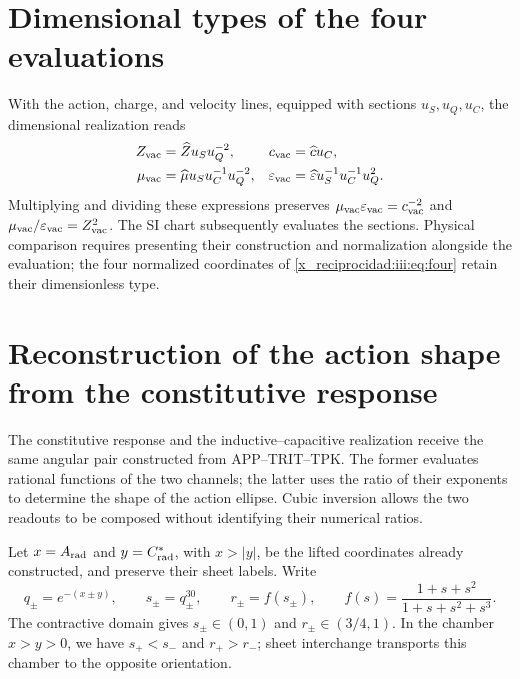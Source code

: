 \section{Dimensional types of the four evaluations}

With the action, charge, and velocity lines, equipped with sections
$u_S,u_Q,u_C$, the dimensional realization reads
\begin{align}
 Z_{\rm vac}&=\widehat Z u_Su_Q^{-2},&
 c_{\rm vac}&=\widehat c u_C,\\
 \mu_{\rm vac}&=\widehat\mu u_Su_C^{-1}u_Q^{-2},&
 \varepsilon_{\rm vac}&=\widehat\varepsilon u_S^{-1}u_C^{-1}u_Q^2.
 \label{x_reciprocidad:iii:eq:dimensions}
\end{align}
Multiplying and dividing these expressions preserves
$\mu_{\rm vac}\varepsilon_{\rm vac}=c_{\rm vac}^{-2}$ and
$\mu_{\rm vac}/\varepsilon_{\rm vac}=Z_{\rm vac}^2$.
The SI chart subsequently evaluates the sections. Physical comparison requires
presenting their construction and normalization alongside the evaluation; the four
normalized coordinates of \eqref{x_reciprocidad:iii:eq:four} retain their dimensionless type.



\section{Reconstruction of the action shape from the constitutive response}
\label{x_reciprocidad:iii:subsec:puente-forma-LC}

The constitutive response and the inductive--capacitive realization receive
the same angular pair constructed from APP--TRIT--TPK. The former evaluates
rational functions of the two channels; the latter uses the ratio of
their exponents to determine the shape of the action ellipse. Cubic
inversion allows the two readouts to be composed without identifying their
numerical ratios.

Let $x=A_{\rm rad}$ and $y=C^*_{\rm rad}$, with $x>|y|$, be the lifted
coordinates already constructed, and preserve their sheet labels. Write
\begin{equation}
 q_\pm=e^{-(x\pm y)},\qquad s_\pm=q_\pm^{30},\qquad
 r_\pm=f(s_\pm),\qquad
 f(s)=\frac{1+s+s^2}{1+s+s^2+s^3}.
 \label{x_reciprocidad:iii:eq:forma-canales}
\end{equation}
The contractive domain gives $s_\pm\in(0,1)$ and
$r_\pm\in(3/4,1)$. In the chamber $x>y>0$, we have
$s_+<s_-$ and $r_+>r_-$; sheet interchange transports this chamber
to the opposite orientation.

